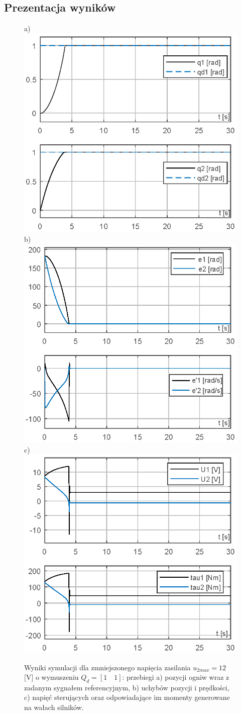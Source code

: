 \documentclass[10pt, a4paper, polish]{article}
\begin{document}
	\subsection{Prezentacja wyników}
	\begin{figure}[h]
		\centering	
		a) \includegraphics[width=0.30\columnwidth]{SRManCw4/SRManL4_ZADANIE1/figs/01Pozycje_U12} b)\includegraphics[width=0.30\columnwidth]{SRManCw4/SRManL4_ZADANIE1/figs/01Uchyby_U12} c)\includegraphics[width=0.30\columnwidth]{SRManCw4/SRManL4_ZADANIE1/figs/01Sygnaly_U12}\caption{
			Wyniki symulacji dla zmniejszonego napięcia zasilania $u_{2max}=12$ [V] o wymuszeniu $Q_d=[1\quad1]$: przebiegi a) pozycji ogniw wraz z zadanym sygnałem referencyjnym, b) uchybów pozycji i prędkości, c)  napięć sterujących oraz odpowiadające im momenty generowane na wałach silników.}\label{fig:hiperkula12v}
	\end{figure}
\end{document}
